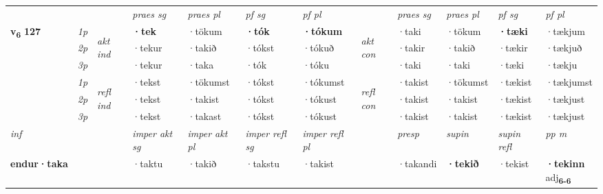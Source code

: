 \begin{longtable}[l]{X>{\footnotesize\itshape}llXXXXlXXXX}
\midrule

 & &   & \textit{praes sg}  & \textit{praes pl}    & \textit{ pf sg} & \textit{pf pl} & & \textit{praes sg}  & \textit{praes pl}    & \textit{pf sg} & \textit{pf pl }  \\ \cmidrule{4-7} \cmidrule{9-12}
 \multirow{2}{*}{{{\textbf{v{\textsubscript{6}}} \Large{\textbf{127}}}}}  & 1p & \multirow{3}{*}{\begin{turn}{90}\textit{akt ind}\end{turn}} & \textbf{·tek} & ·tökum & \textbf{·tók} & \textbf{·tókum} & \multirow{3}{*}{\begin{turn}{90}\textit{akt con}\end{turn}} &·taki & ·tökum & \textbf{·tæki} & ·tækjum\\*
 & 2p &  &  ·tekur  & ·takið & ·tókst & ·tókuð & & ·takir & ·takið & ·tækir & ·tækjuð \\*
 & 3p &  & ·tekur & ·taka & ·tók & ·tóku & & ·taki & ·taki& ·tæki & ·tækju \\*
\cmidrule{4-7} \cmidrule{9-12}
 & 1p & \multirow{3}{*}{\begin{turn}{90}\textit{refl ind}\end{turn}}  & ·tekst & ·tökumst & ·tókst & ·tókumst & \multirow{3}{*}{\begin{turn}{90}\textit{refl con}\end{turn}}  &·takist & ·tökumst & ·tækist & ·tækjumst \\*
 & 2p &  & ·tekst & ·takist & ·tókst & ·tókust & &·takist & ·takist & ·tækist & ·tækjust \\*
 & 3p  & & ·tekst & ·takast & ·tókst & ·tókust & & ·takist & ·takist& ·tækist & ·tækjust \\*
\cmidrule{4-7} \cmidrule{9-12}

   {\textit{inf}} & &  & \textit{imper akt sg} & \textit{imper akt pl} & \textit{imper refl sg} & \textit{imper refl pl} && \textit{presp} & \textit{supin} & \textit{supin refl} & \textit{pp m} \\*
  {\textbf{endur\allowbreak ·taka}} & && ·taktu  & ·takið & ·takstu & ·takist && ·takandi &  \textbf{·tekið} & ·tekist & \specialcell{\textbf{·tekinn} \\ adj\textbf{\textsubscript{6-6}}} \\*

\midrule


\end{longtable}
